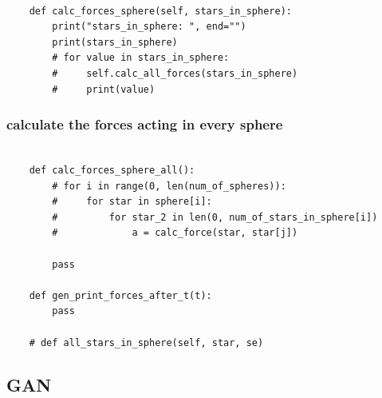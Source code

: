 \begin{lstlisting}

    def calc_forces_sphere(self, stars_in_sphere):
        print("stars_in_sphere: ", end="")
        print(stars_in_sphere)
        # for value in stars_in_sphere:
        #     self.calc_all_forces(stars_in_sphere)
        #     print(value)

\end{lstlisting}

\subsubsection{calculate the forces acting in every sphere}

\begin{lstlisting}

    def calc_forces_sphere_all():
        # for i in range(0, len(num_of_spheres)):
        #     for star in sphere[i]:
        #         for star_2 in len(0, num_of_stars_in_sphere[i])
        #             a = calc_force(star, star[j])

        pass

    def gen_print_forces_after_t(t):
        pass

    # def all_stars_in_sphere(self, star, se)

\end{lstlisting}

\subsection{GAN}
